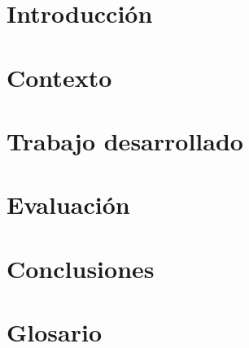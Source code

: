 \documentclass[12pt, a4paper, titlepage, twoside, openright]{report}
\begin{document}
	
	\cleardoublepage
	
	\cleardoublepage
	
	\cleardoublepage
	
	\cleardoublepage
	
	\cleardoublepage
	
	\cleardoublepage
	
	\tableofcontents
	\cleardoublepage
	
	\chapter{Introducción}
	\label{introduction}
	\cleardoublepage
	
	\chapter{Contexto}
	\label{background}
	
	\cleardoublepage

	\chapter{Trabajo desarrollado}
	\label{mainwork}
	\cleardoublepage
	
	\chapter{Evaluación}
	\label{evaluation}
	\cleardoublepage
	
	\chapter{Conclusiones}
	\label{conclusions}
	\cleardoublepage
	
	\listoftables
	\cleardoublepage
	
	\listoffigures
	\cleardoublepage
	
	\appendix
	\label{appendices}
	
	\chapter{Glosario}
	\cleardoublepage
	\cleardoublepage
	
	
\end{document}
